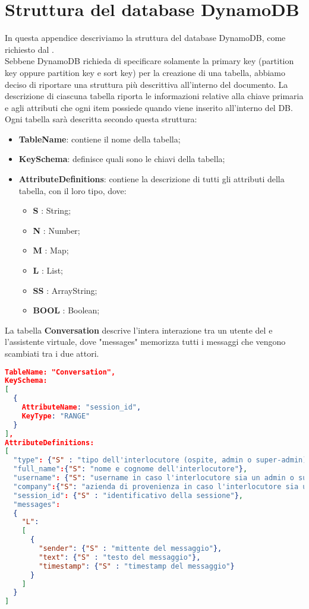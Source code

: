 \section{Struttura del database DynamoDB}
In questa appendice descriviamo la struttura del database DynamoDB, come richiesto dal  \PROPONENTE. \\
Sebbene DynamoDB richieda di specificare solamente la primary key (partition key oppure partition key e sort key) per la creazione di una tabella, abbiamo deciso di riportare una struttura più descrittiva all'interno del documento. La descrizione di ciascuna tabella riporta le informazioni relative alla chiave primaria e agli attributi che ogni item possiede quando viene inserito all'interno del DB.
Ogni tabella sarà descritta secondo questa struttura:
\begin{itemize}
 \item \textbf{TableName}: contiene il nome della tabella;
 \item \textbf{KeySchema}: definisce quali sono le chiavi della tabella;
 \item \textbf{AttributeDefinitions}: contiene la descrizione di tutti gli attributi della tabella, con il loro tipo, dove:
 \begin{itemize}
  \item \textbf{S} : String;
  \item \textbf{N} : Number;
  \item \textbf{M} : Map;
  \item \textbf{L} : List;
  \item \textbf{SS} : ArrayString;
  \item \textbf{BOOL} : Boolean;
 \end{itemize}
\end{itemize}
La tabella \textbf{Conversation} descrive l'intera interazione tra un utente del  e l'assistente virtuale, dove "messages" memorizza tutti i messaggi che vengono scambiati tra i due attori.
\begin{lstlisting}[language=json,firstnumber=1]
TableName: "Conversation",
KeySchema:
[
  {
    AttributeName: "session_id",
    KeyType: "RANGE"
  }
],
AttributeDefinitions:
[
  "type": {"S" : "tipo dell'interlocutore (ospite, admin o super-admin)"},
  "full_name":{"S": "nome e cognome dell'interlocutore"},
  "username": {"S": "username in caso l'interlocutore sia un admin o super-admin"},
  "company":{"S": "azienda di provenienza in caso l'interlocutore sia un ospite"},
  "session_id": {"S" : "identificativo della sessione"},
  "messages":
  {
    "L":
    [
      {
        "sender": {"S" : "mittente del messaggio"},
        "text": {"S" : "testo del messaggio"},
        "timestamp": {"S" : "timestamp del messaggio"}
      }
    ]
  }
]
\end{lstlisting}
